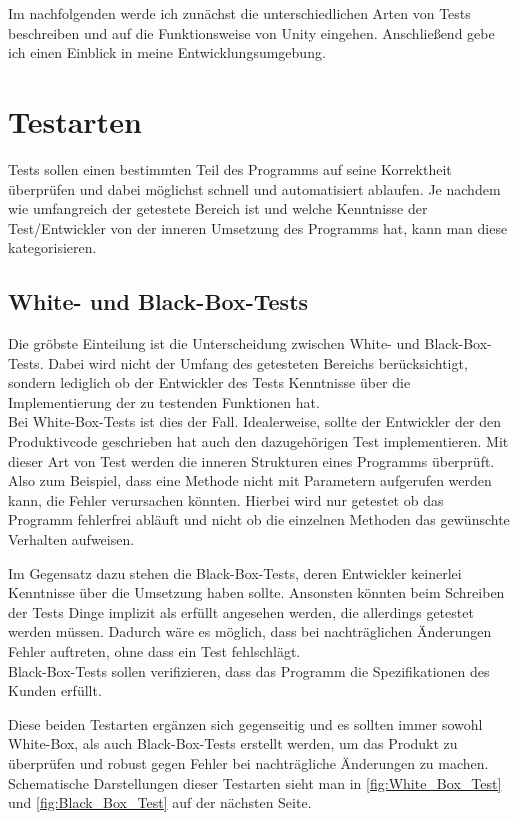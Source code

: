 Im nachfolgenden werde ich zunächst die unterschiedlichen Arten von Tests beschreiben und auf die Funktionsweise von Unity eingehen. Anschließend gebe ich einen Einblick in meine Entwicklungsumgebung.

\section{Testarten}
\label{sec:Testarten}

Tests sollen einen bestimmten Teil des Programms auf seine Korrektheit überprüfen und dabei möglichst schnell und automatisiert ablaufen. Je nachdem wie umfangreich der getestete Bereich ist und welche Kenntnisse der Test/Entwickler von der inneren Umsetzung des Programms hat, kann man diese kategorisieren.

\subsection{White- und Black-Box-Tests}

Die gröbste Einteilung ist die Unterscheidung zwischen White- und Black-Box-Tests. Dabei wird nicht der Umfang des getesteten Bereichs berücksichtigt, sondern lediglich ob der Entwickler des Tests Kenntnisse über die Implementierung der zu testenden Funktionen hat.\\
Bei White-Box-Tests ist dies der Fall. Idealerweise, sollte der Entwickler der den Produktivcode geschrieben hat auch den dazugehörigen Test implementieren. Mit dieser Art von Test werden die inneren Strukturen eines Programms überprüft. Also zum Beispiel, dass eine Methode nicht mit Parametern aufgerufen werden kann, die Fehler verursachen könnten. Hierbei wird nur getestet ob das Programm fehlerfrei abläuft und nicht ob die einzelnen Methoden das gewünschte Verhalten aufweisen.

Im Gegensatz dazu stehen die Black-Box-Tests, deren Entwickler keinerlei Kenntnisse über die Umsetzung haben sollte. Ansonsten könnten beim Schreiben der Tests Dinge implizit als erfüllt angesehen werden, die allerdings getestet werden müssen. Dadurch wäre es möglich, dass bei nachträglichen Änderungen Fehler auftreten, ohne dass ein Test fehlschlägt.\\
Black-Box-Tests sollen verifizieren, dass das Programm die Spezifikationen des Kunden erfüllt.

Diese beiden Testarten ergänzen sich gegenseitig und es sollten immer sowohl White-Box, als auch Black-Box-Tests erstellt werden, um das Produkt zu überprüfen und robust gegen Fehler bei nachträgliche Änderungen zu machen.\\
Schematische Darstellungen dieser Testarten sieht man in \autoref{fig:White_Box_Test} und \autoref{fig:Black_Box_Test} auf der nächsten Seite.


